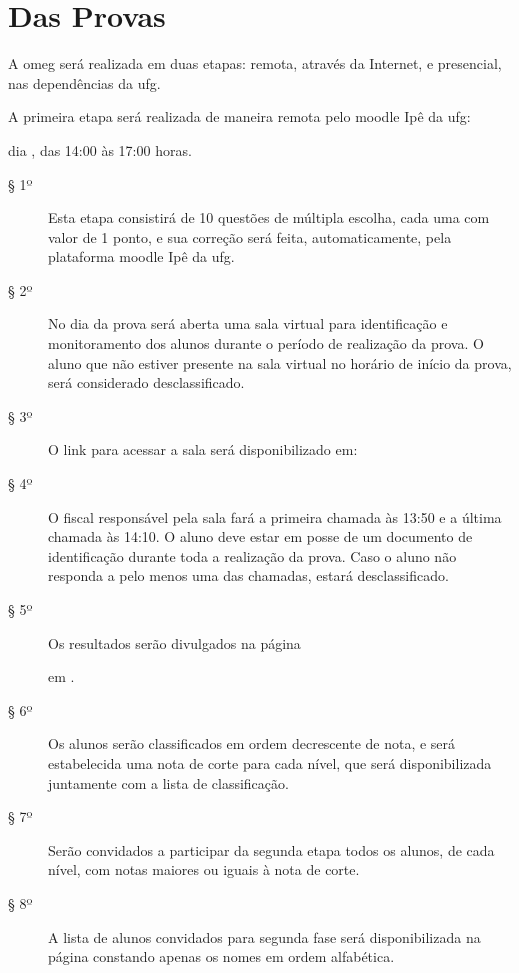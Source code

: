 \section*{Das Provas}

\begin{article}
  A \currentEdition{} \acrshort{omeg} será realizada em duas etapas: remota,
  através da Internet, e presencial, nas dependências da \acrshort{ufg}.
\end{article}

\begin{article}
  A primeira etapa será realizada de maneira remota pelo \acrshort{moodle} Ipê
  da \acrshort{ufg}:
  \begin{center}
    \href{\moodleufg}{\moodleufg}
  \end{center}
  dia \phaseOne, das 14:00 às 17:00 horas.
  \begin{description}
    \item[§ 1º]
      Esta etapa consistirá de 10 questões de múltipla escolha, cada uma com
      valor de 1 ponto, e sua correção será feita, automaticamente, pela
      plataforma \acrshort{moodle} Ipê da \acrshort{ufg}.
    \item[§ 2º]
      No dia da prova será aberta uma sala virtual para identificação e
      monitoramento dos alunos durante o período de realização da prova. O
      aluno que não estiver presente na sala virtual no horário de início da
      prova, será considerado desclassificado.
    \item[§ 3º]
      O link para acessar a sala será disponibilizado em:
      \begin{center}
        \homepage
      \end{center}
    \item[§ 4º]
      O fiscal responsável pela sala fará a primeira chamada às 13:50 e a
      última chamada às 14:10. O aluno deve estar em posse de um documento de
      identificação durante toda a realização da prova. Caso o aluno não
      responda a pelo menos uma das chamadas, estará desclassificado.
    \item[§ 5º]
      Os resultados serão divulgados na página
      \begin{center}
        \homepage
      \end{center}
      em \resultsFromPhaseOne.
    \item[§ 6º]
      Os alunos serão classificados em ordem decrescente de nota, e será
      estabelecida uma nota de corte para cada nível, que será disponibilizada
      juntamente com a lista de classificação.
    \item[§ 7º]
      Serão convidados a participar da segunda etapa todos os alunos, de cada
      nível, com notas maiores ou iguais à nota de corte.
    \item[§ 8º]
      A lista de alunos convidados para segunda fase será disponibilizada na
      página \homepage constando apenas os nomes em ordem
      alfabética.
  \end{description}
\end{article}


